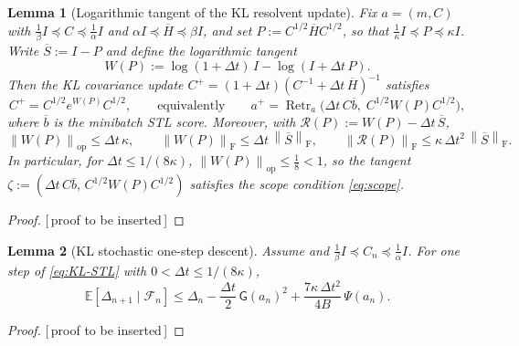 \documentclass[11pt]{article}
\theoremstyle{plain}
\newtheorem{lemma}[lemma]{Lemma}
\theoremstyle{definition}
\theoremstyle{remark}
\newcommand{\E}{\mathbb{E}}
\newcommand{\Id}{I}
\newcommand{\op}{\mathrm{op}}
\newcommand{\Frob}{\mathrm{F}}
\newcommand{\Fil}{\mathcal{F}}
\newcommand{\norm}[1]{\left\lVert #1\right\rVert}
\newcommand{\Gradnorm}{\mathsf{G}}
\newcommand{\Retr}{\operatorname{Retr}}
\newcommand{\PROOFHOLE}{{\color{red}\textsf{[\,proof to be inserted\,]}}}
\begin{document}
\begin{lemma}[Logarithmic tangent of the KL resolvent update]
\label{lem:KL-logtangent}
Fix $a=(m,C)$ with $\tfrac1\beta\Id\preceq C\preceq\tfrac1\alpha\Id$ and $\alpha\Id\preceq\overline H\preceq\beta\Id$,
and set $P:=C^{1/2}\overline HC^{1/2}$, so that $\tfrac1\kappa\Id\preceq P\preceq\kappa\Id$. Write
$\overline S:=\Id-P$ and define the logarithmic tangent
\begin{equation}
\label{eq:Wlog}
    W(P):=\log(1+\Delta t)\,\Id-\log(\Id+\Delta t\,P).
\end{equation}
Then the KL covariance update $C^+=(1+\Delta t)(C^{-1}+\Delta t\,\overline H)^{-1}$ satisfies
\begin{equation}
\label{eq:KL-retr}
    C^+=C^{1/2}e^{W(P)}C^{1/2},
    \qquad\text{equivalently}\qquad
    a^+=\Retr_a\bigl(\Delta t\,C\overline b,\;C^{1/2}W(P)C^{1/2}\bigr),
\end{equation}
where $\overline b$ is the minibatch STL score. Moreover, with $\mathcal R(P):=W(P)-\Delta t\,\overline S$,
\begin{equation}
\label{eq:Wlog-bounds}
    \norm{W(P)}_\op\leq\Delta t\,\kappa,
    \qquad
    \norm{W(P)}_{\Frob}\leq\Delta t\,\norm{\overline S}_{\Frob},
    \qquad
    \norm{\mathcal R(P)}_{\Frob}\leq\kappa\,\Delta t^2\,\norm{\overline S}_{\Frob}.
\end{equation}
In particular, for $\Delta t\leq1/(8\kappa)$, $\norm{W(P)}_\op\leq\tfrac18<1$, so the tangent
$\zeta:=(\Delta t\,C\overline b,\,C^{1/2}W(P)C^{1/2})$ satisfies the scope condition \eqref{eq:scope}.
\end{lemma}

\begin{proof}
\PROOFHOLE
\end{proof}

\begin{lemma}[KL stochastic one-step descent]
\label{lem:KL-onestep-stoch}
Assume  and $\tfrac1\beta\Id\preceq C_n\preceq\tfrac1\alpha\Id$. For
one step of \eqref{eq:KL-STL} with $0<\Delta t\leq1/(8\kappa)$,
\begin{equation}
\label{eq:KL-onestep-Psi}
    \E[\Delta_{n+1}\mid\Fil_n]
    \leq\Delta_n-\frac{\Delta t}2\,\Gradnorm(a_n)^2
    +\frac{7\kappa\,\Delta t^2}{4B}\,\Psi(a_n).
\end{equation}
\end{lemma}

\begin{proof}
\PROOFHOLE
\end{proof}
\end{document}
